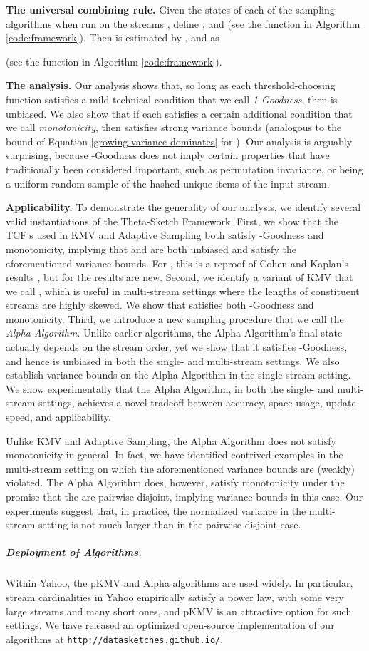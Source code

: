 \documentclass{article}
\newcommand{\edit}[1]{{#1}}
\begin{document}
\medskip
\noindent \textbf{The universal combining rule.} Given the states  of each of the  sampling algorithms when run on the streams ,
define , and  (see the function  in Algorithm \ref{code:framework}). 
Then  is estimated by , and  as 

(see the function  in Algorithm \ref{code:framework}).

\medskip
\noindent \textbf{The analysis.} Our analysis shows that, so long as each threshold-choosing function  satisfies a mild technical condition that we 
call \emph{1-Goodness}, then  is unbiased. We also show that if each  satisfies a certain additional condition that we call \emph{monotonicity}, then 
 satisfies strong variance bounds (analogous to the bound of Equation \eqref{growing-variance-dominates} for ).  
Our analysis is arguably surprising, because -Goodness does not imply certain properties that have
traditionally been considered important, such as permutation invariance, or  being a uniform
random sample of the hashed unique items of the input stream.

\medskip
\noindent \textbf{Applicability.}  To demonstrate the generality of our analysis, we identify several valid instantiations of the Theta-Sketch Framework. 
First, we show that the TCF's used in KMV and Adaptive Sampling both satisfy -Goodness and monotonicity, implying that  and  are both unbiased and 
satisfy the aforementioned variance bounds. For , this is a reproof
of Cohen and Kaplan's results \cite{cohen2009leveraging}, but for  the results are new.
Second, we identify a variant of KMV that we call ,  which is useful in multi-stream settings where the lengths of constituent streams are highly skewed.
We show that  satisfies both -Goodness and monotonicity. Third, we introduce a new sampling procedure that we call the \emph{Alpha Algorithm}. Unlike earlier algorithms, the Alpha Algorithm's
 final state actually depends on the stream order, yet we  
 show that it satisfies -Goodness, and hence
is unbiased in both the single- and multi-stream settings.
We also establish variance bounds on the Alpha Algorithm in the single-stream setting.
We show experimentally that the Alpha Algorithm, in both the single- and multi-stream settings, 
achieves a novel tradeoff between accuracy, space usage, update speed, and applicability. 

Unlike KMV and Adaptive Sampling, the Alpha Algorithm does not satisfy monotonicity in general. In fact, we have identified contrived examples
in the multi-stream setting on which the aforementioned variance bounds are (weakly) violated.
The Alpha Algorithm does, however, satisfy monotonicity under the promise that the  are pairwise disjoint, implying variance bounds in this case. 
Our experiments suggest that, in practice, the \edit{normalized} variance in the multi-stream setting is not much larger than in the pairwise disjoint case.
\edit{\subparagraph*{Deployment of Algorithms.}  Within Yahoo, the pKMV and Alpha algorithms are used widely. In particular,
stream cardinalities in Yahoo empirically satisfy a power law, with some very large streams and many short ones, and pKMV is an attractive option for such settings. 
We have released an optimized open-source implementation of our algorithms at \texttt{http://datasketches.github.io/}.}
\end{document}
